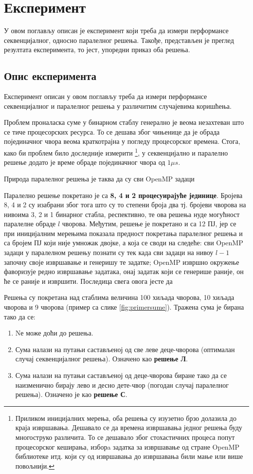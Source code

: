 \section{Експеримент}

У овом поглављу описан је експеримент који треба да измери перформансе секвенцијалног, односно паралелног решења.
Такође, представљен је преглед резултата експеримента, то јест, упоредни приказ оба решења.

\subsection{Опис експеримента}

Експеримент описан у овом поглављу треба да измери перформансе секвенцијалног и паралелног решења у различитим случајевима коришћења.

Проблем проналаска суме у бинарном стаблу генерално је веома незахтеван што се тиче процесорских ресурса.
То се дешава због чињенице да је обрада појединачног чвора веома краткотрајна у погледу процесорског времена.
Стога, како би проблем било доследније измерити
\footnote{Приликом иницијалних мерења, оба решења су изузетно брзо долазила до краја извршавања.
Дешавало се да времена извршавања једног решења буду многоструко различита.
То се дешавало због стохастичних процеса попут процесорског кеширања, изборa задатка за извршавање од стране OpenMP библиотеке итд.
који су од извршавања до извршавања били мање или више повољнији.},
у секвенцијално и паралелно решење додато је време обраде појединачног чвора од $1\mu s$.

Природа паралелног решења је таква да су сви OpenMP задаци 

Паралелно решење покретано је са \textbf{8, 4 и 2 процесуирајуће јединице}.
Бројева 8, 4 и 2 су изабрани због тога што су то степени броја два тј. бројеви чворова на нивоима 3, 2 и 1 бинарног стабла, респективно, те ова решења нуде
могућност паралелне обраде $l$ чворова. Међутим, решење је покретано и са 12 ПЈ, јер се при иницијалним мерењима показала предност покретања паралелног решења
и са бројем ПЈ који није умножак двојке, а која се своди на следеће: сви OpenMP задаци у паралелном решењу познати су тек када сви задаци на нивоу $l-1$ започну
своје извршавање и генеришу те задатке; OpenMP извршно окружење фаворизује редно извршавање задатака, онај задатак који се генерише раније, он ће се раније и извршити.
Последица свега овога јесте да 

Решења су покретана над стаблима величина 100 хиљада чворова, 10 хиљада чворова и 9 чворова (пример са слике \ref{fig:primersume}).
Тражена сума је бирана тако да се:
\begin{enumerate}
    \item Nе може доћи до решења.
    \item Сума налази на путањи састављеној од све леве деце-чворова (оптималан случај секвенцијалног решења). Означено као \textbf{решење Л}.
    \item Сума налази на путањи састављеној од деце-чворова биране тако да се наизменично бирају лево и десно дете-чвор (погодан случај паралелног решења).
    Означено је као \textbf{решење С}.
\end{enumerate}

